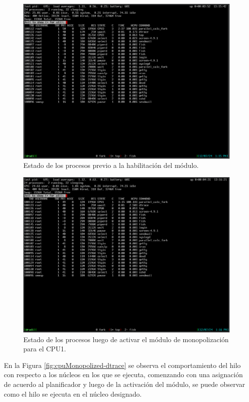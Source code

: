 \begin{figure}[H]
    \centering
    \includegraphics[width=1\textwidth]{images/cpuMonopolized-idle.png}
    \caption{Estado de los procesos previo a la habilitación del módulo.}
    \label{fig:cpuMonopolized-idle}
\end{figure}

\begin{figure}[H]
    \centering
    \includegraphics[width=1\textwidth]{images/cpuMonopolized-on.png}
    \caption{Estado de los procesos luego de activar el módulo de monopolización para el CPU1.}
    \label{fig:cpuMonopolized-on}
\end{figure}

En la Figura \ref{fig:cpuMonopolized-dtrace} se observa el comportamiento del hilo con respecto a los núcleos en los que se ejecuta, comenzando con una asignación de acuerdo al planificador y luego de la activación del módulo, se puede observar como el hilo se ejecuta en el núcleo designado.\par

